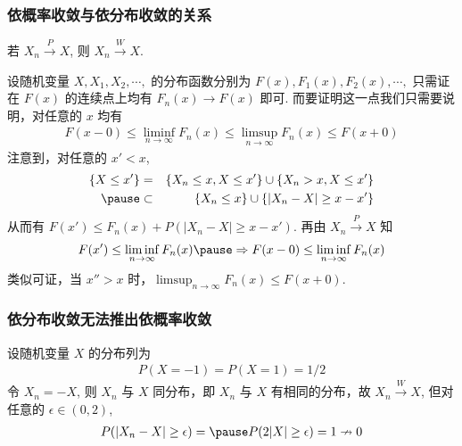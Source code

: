 \begin{frame}
	\frametitle{依概率收敛与依分布收敛的关系}
	\begin{thm}
		若 $X_n\stackrel{P}{\rightarrow} X$, 则 $X_n\stackrel{W}{\rightarrow} X$.
	\end{thm}

	\pause \zheng 设随机变量 $X,X_1, X_2,\cdots,$ 的分布函数分别为 $F (x), F_1 (x),F_2 (x),\cdots,$ \pause 只需证在 $F (x)$ 的连续点上均有 $F_n (x)\rightarrow F (x)$ 即可. \pause 而要证明这一点我们只需要说明，对任意的 $x$ 均有
	\begin{eqnarray*}
		F(x-0)\le \liminf_{n\rightarrow\infty} F_n(x)\le \limsup_{n\rightarrow\infty} F_n(x)\le F(x+0)
	\end{eqnarray*}
	\pause 注意到，对任意的 $x'<x$,
	\begin{eqnarray*}
		\{X\le x'\}&=&\{X_n\le x, X\le x'\}\cup\{X_n>x,X\le x'\}\\
		\pause &\subset&\{X_n\le x\}\cup\{|X_n-X|\ge x-x'\}
	\end{eqnarray*}
	\pause 从而有 $F (x')\le F_n (x)+P (|X_n-X|\ge x-x')$. \pause 再由 $X_n\stackrel{P}{\rightarrow} X$ 知
	\pause \begin{eqnarray*}
		F(x')\le \liminf_{n\rightarrow\infty}F_n(x) \pause \Rightarrow F(x-0)\le \liminf_{n\rightarrow\infty}F_n(x)
	\end{eqnarray*}
	\pause 类似可证，当 $x''>x$ 时，$\limsup_{n\rightarrow\infty} F_n (x)\le F (x+0)$.
\end{frame}
\begin{frame}
	\frametitle{依分布收敛无法推出依概率收敛}
	\begin{exam}
		设随机变量 $X$ 的分布列为
		\begin{eqnarray*}
			P(X=-1)=P(X=1)=1/2
		\end{eqnarray*}
		令 $X_n=-X$, 则 $X_n$ 与 $X$ 同分布，即 $X_n$ 与 $X$ 有相同的分布，故 $X_n\stackrel{W}{\rightarrow} X$, \pause 但对任意的 $\epsilon\in (0,2)$,\pause
		\begin{eqnarray*}
			P(|X_n-X|\ge \epsilon)=\pause P(2|X|\ge \epsilon)=1\nrightarrow 0
		\end{eqnarray*}

	\end{exam}

\end{frame}

